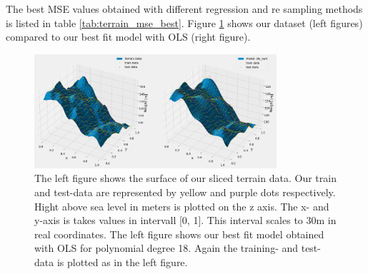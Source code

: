 The best MSE values obtained with different regression and re sampling methods
is listed in table \ref{tab:terrain_mse_best}. Figure \ref{fig:terrain_model}
shows our dataset (left figures) compared to our best fit model with OLS (right
figure). 

\begin{figure}[H]
    \centering
    \includegraphics[width=0.8\textwidth]{Figures/terrain_data_and_model_ols_best.png}
    \caption{The left figure shows the surface of our sliced terrain data. Our
    train and test-data are represented by yellow and purple dots respectively.
Hight above sea level in meters is plotted on the z axis. The x- and y-axis is
takes values in intervall [0, 1]. This interval scales to 30m in real
coordinates. The left figure shows our best fit model obtained with OLS for
polynomial degree 18. Again the training- and test-data is plotted as in the
left figure.}  
    \label{fig:terrain_model} 
\end{figure}

